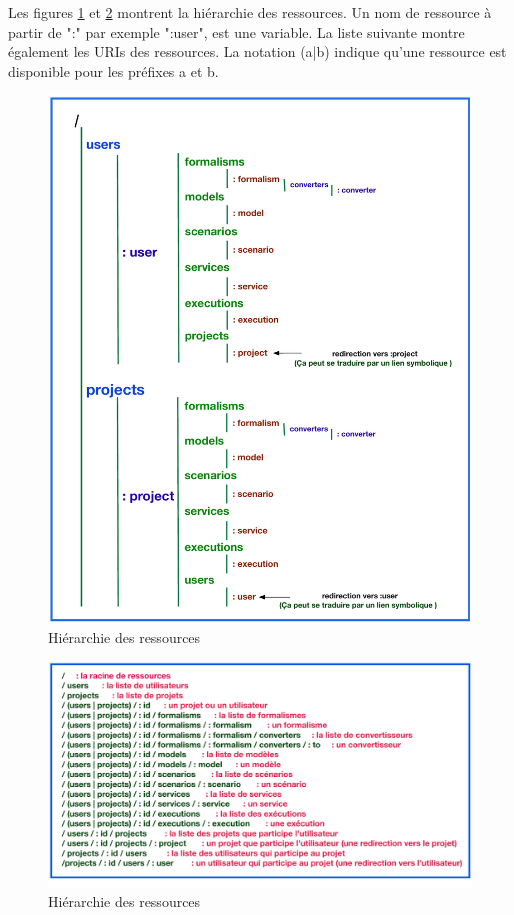 \documentclass{report}
\begin{document}
Les figures \ref{fig:hierarchy} et \ref{fig:uri} montrent la hiérarchie des ressources.
Un nom de ressource à partir de ":" par exemple ":user", est une variable. La liste suivante montre également les URIs des
ressources. La notation (a|b) indique qu'une ressource est disponible pour les préfixes a et b.


\begin{figure}[h!]
     \centering
     \includegraphics[scale=0.60] {img/resources_hierarchy.pdf}
     \caption{Hiérarchie des ressources}
     \label{fig:hierarchy}
\end{figure}

\begin{figure}[h!]
    \centering
    \includegraphics[scale=0.60]{img/resources_uri.pdf}
    \caption{Hiérarchie des ressources}
    \label{fig:uri}
\end{figure}
\end{document}
